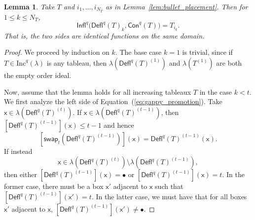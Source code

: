 \documentclass[12pt]{amsart}
\newcommand{\x}{\ensuremath{\mathsf{x}}}
\newtheorem{lemma}[theorem]{Lemma}
\theoremstyle{definition}
\theoremstyle{remark}
\numberwithin{equation}{section}
\renewcommand{\emptyset}{\varnothing}
\newcommand{\inc}{\ensuremath{\mathrm{Inc}}}
\newcommand{\swap}{\ensuremath{\mathsf{swap}}}
\newcommand{\rep}{\ensuremath{\mathsf{Rep}}}
\newcommand{\deflate}{\ensuremath{\mathsf{Defl}}}
\newcommand{\tinflate}{\ensuremath{\mathsf{Infl}}}
\newcommand{\content}{\ensuremath{\mathsf{Con}}}
\begin{document}
\begin{lemma} \label{lem:gappy_promotion}
Take $T$ and $i_1,...,i_{N_T}$ as in Lemma~\ref{lem:bullet_placement}. Then for $1 \leq k \leq N_T$, 
\begin{equation}\label{eq:gappy_promotion}
 \tinflate^q \Big( \deflate^q(T)_k, \content^q(T) \Big) = T_{i_k}. 
\end{equation}
That is, the two sides are identical functions on the same domain. 
\end{lemma}

\begin{proof}  We proceed by induction on $k$. The base case $k=1$ is trivial, since if $T \in \inc^q(\lambda)$ is any tableau, then $\lambda \left( \deflate^q(T)^{(1)} \right)$ and $\lambda \left( T^{(1)} \right)$ are both the empty order ideal.

Now, assume that the lemma holds for all increasing tableaux $T$ in the case $k < t$. We first analyze the left side of Equation~(\ref{eq:gappy_promotion}). Take $\x \in \lambda\left( \deflate^q(T)^{(t)} \right)$. If $\x \in \lambda\left( \deflate^q(T)^{(t-1)} \right)$, then 
$[\deflate^q(T)^{(t-1)}](\x) \leq t-1$ and hence
\[
\left[ \swap_{t}(\deflate^q(T)^{(t-1)})\right](\x) = \deflate^q(T)^{(t-1)}(\x).
\]
 If instead
 \[\x \in \lambda\left(\deflate^q(T)^{(t)}\right) \setminus \lambda\left(\deflate^q(T)^{(t-1)}\right),\]
  then either $[\deflate^q(T)^{(t-1)}](\x) = \bullet$ or $[\deflate^q(T)^{(t-1)}](\x) = t$. In the former case, there must be a box $\x'$ adjacent to $\x$ such that $[\deflate^q(T)^{(t-1)}](\x') = t$. In the latter case, we must have that for all boxes $\x'$ adjacent to $\x$, $[\deflate^q(T)^{(t-1)}](\x') \neq \bullet$. 


\end{proof}
\end{document}
